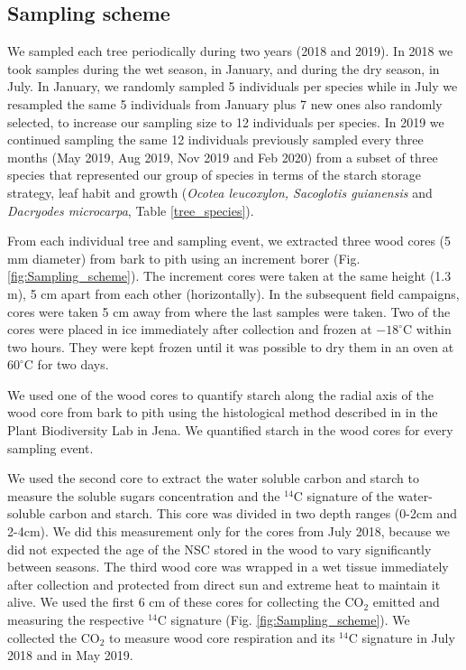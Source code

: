 \documentclass{article}
\begin{document}
 
\subsection{Sampling scheme}

We sampled each tree periodically during two years (2018 and 2019). In 2018 we took samples during the wet season, in January, and during the dry season, in July. In January, we randomly sampled 5 individuals per species while in July we resampled the same 5 individuals from January plus 7 new ones also randomly selected, to increase our sampling size to 12 individuals per species. In 2019 we continued sampling the same 12 individuals previously sampled every three months (May 2019, Aug 2019, Nov 2019 and Feb 2020) from a subset of three species that represented our group of species in terms of the starch storage strategy, leaf habit and growth (\textit{Ocotea leucoxylon, Sacoglotis guianensis} and \textit{Dacryodes microcarpa}, Table \ref{tree_species}). 

From each individual tree and sampling event, we extracted three wood cores (5 mm diameter) from bark to pith using an increment borer (Fig. \ref{fig:Sampling_scheme}). The increment cores were taken at the same height (1.3 m), 5 cm apart from each other (horizontally). In the subsequent field campaigns, cores were taken 5 cm away from where the last samples were taken. Two of the cores were placed in ice immediately after collection and frozen at $-18^{\circ}$C within two hours. They were kept frozen until it was possible to dry them in an oven at $60^{\circ}$C for two days. 

We used one of the wood cores to quantify starch along the radial axis of the wood core from bark to pith using the histological method described in \citep{Herrera-remirez:2021} in the Plant Biodiversity Lab in Jena. We quantified starch in the wood cores for every sampling event.

We used the second core to extract the water soluble carbon and starch to measure the soluble sugars concentration and the $^{14}$C signature of the water-soluble carbon and starch. This core was divided in two depth ranges (0-2cm and 2-4cm). We did this measurement only for the cores from July 2018, because we did not expected the age of the NSC stored in the wood to vary significantly between seasons. 
The third wood core was wrapped in a wet tissue immediately after collection and protected from direct sun and extreme heat to maintain it alive. We used the first 6 cm of these cores for collecting the CO$_{2}$ emitted and measuring the respective $^{14}$C signature (Fig. \ref{fig:Sampling_scheme}). We collected the CO$_{2}$ to measure wood core respiration and its $^{14}$C signature in July 2018 and in May 2019. 
\end{document}
